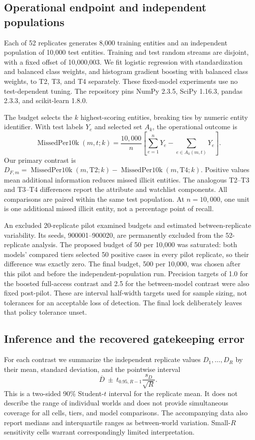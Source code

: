 \documentclass[11pt,a4paper]{article}
\newcommand{\Miss}{\operatorname{MissedPer10k}}
\begin{document}
\subsection{Operational endpoint and independent populations}
Each of 52 replicates generates 8,000 training entities and an independent population of 10,000 test entities. Training and test random streams are disjoint, with a fixed offset of 10,000,003. We fit logistic regression with standardization and balanced class weights, and histogram gradient boosting with balanced class weights, to T2, T3, and T4 separately. These fixed-model experiments use no test-dependent tuning. The repository pins NumPy 2.3.5, SciPy 1.16.3, pandas 2.3.3, and scikit-learn 1.8.0.

The budget selects the $k$ highest-scoring entities, breaking ties by numeric entity identifier. With test labels $Y_e$ and selected set $A_k$, the operational outcome is
\begin{equation}
\Miss(m,t;k)=\frac{10,000}{n}\left[\sum_{e=1}^{n}Y_e-\sum_{e\in A_k(m,t)}Y_e\right].
\end{equation}
Our primary contrast is $D_{F,m}=\Miss(m,\mathrm{T2};k)-\Miss(m,\mathrm{T4};k)$. Positive values mean additional information reduces missed illicit entities. The analogous T2--T3 and T3--T4 differences report the attribute and watchlist components. All comparisons are paired within the same test population. At $n=10,000$, one unit is one additional missed illicit entity, not a percentage point of recall.

An excluded 20-replicate pilot examined budgets and estimated between-replicate variability. Its seeds, 900001--900020, are permanently excluded from the 52-replicate analysis. The proposed budget of 50 per 10,000 was saturated: both models' compared tiers selected 50 positive cases in every pilot replicate, so their difference was exactly zero. The final budget, 500 per 10,000, was chosen after this pilot and before the independent-population run. Precision targets of 1.0 for the boosted full-access contrast and 2.5 for the between-model contrast were also fixed post-pilot. These are interval half-width targets used for sample sizing, not tolerances for an acceptable loss of detection. The final lock deliberately leaves that policy tolerance unset.

\subsection{Inference and the recovered gatekeeping error}\label{sec:inference}
For each contrast we summarize the independent replicate values $D_1,\ldots,D_R$ by their mean, standard deviation, and the pointwise interval
\begin{equation}
\overline D\ \pm\ t_{0.95,R-1}\frac{s_D}{\sqrt{R}}.
\end{equation}
This is a two-sided 90\% Student-$t$ interval for the replicate mean. It does not describe the range of individual worlds and does not provide simultaneous coverage for all cells, tiers, and model comparisons. The accompanying data also report medians and interquartile ranges as between-world variation. Small-$R$ sensitivity cells warrant correspondingly limited interpretation.
\end{document}
